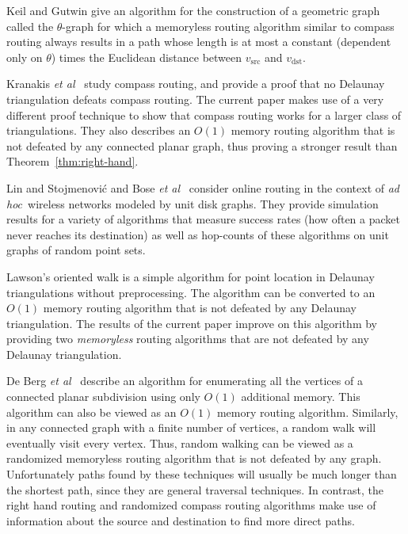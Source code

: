 \documentclass[final]{siamltex}
\newcommand{\comment}[1]{}
\newcommand{\etal}{{\em et al\/}}
\newcommand{\adhoc}{{\em ad hoc\/}}
\newcommand{\thmref}[1]{Theorem~\ref{thm:#1}}
\newcommand{\vsrc}{v_\mathrm{src}}
\newcommand{\vdest}{v_\mathrm{dst}}
\begin{document}
Keil and Gutwin \cite{kg92} give an algorithm for the construction of
a geometric graph called the $\theta$-graph for which a memoryless
routing algorithm similar to compass routing always results in a path
whose length is at most a constant (dependent only on $\theta$) times
the Euclidean distance between $\vsrc$ and $\vdest$.


Kranakis \etal\ \cite{ksu99} study compass routing, and provide a
proof that no Delaunay triangulation defeats compass routing.  The
current paper makes use of a very different proof technique to show
that compass routing works for a larger class of triangulations.  They
also describes an $O(1)$ memory routing algorithm that is not defeated
by any connected planar graph, thus proving a stronger result than
\thmref{right-hand}.

Lin and Stojmenovi\'c \cite{ls98} and Bose \etal\ \cite{bmsu99}
consider online routing in the context of \adhoc\ wireless networks
modeled by unit disk graphs.  They provide simulation results for a
variety of algorithms that measure success rates (how often a packet
never reaches its destination) as well as hop-counts of these
algorithms on unit graphs of random point sets.

Lawson's oriented walk \cite{l77} is a simple algorithm for point
location in Delaunay triangulations without preprocessing.  The
algorithm can be converted to an $O(1)$ memory routing algorithm that
is not defeated by any Delaunay triangulation.  The results of the
current paper improve on this algorithm by providing two {\em
memoryless\/} routing algorithms that are not defeated by any Delaunay
triangulation.

\comment{Generalizing results of Gold \etal\ \cite{gcr77} and
Edelsbrunner \etal\ \cite{egs86}, } De Berg \etal\ \cite{bkoo97}
describe an algorithm for enumerating all the vertices of a connected
planar subdivision using only $O(1)$ additional memory.  This
algorithm can also be viewed as an $O(1)$ memory routing algorithm.
Similarly, in any connected graph with a finite number of vertices, a
random walk will eventually visit every vertex.  Thus, random walking
can be viewed as a randomized memoryless routing algorithm that is not
defeated by any graph.  Unfortunately paths found by these techniques
will usually be much longer than the shortest path, since they are
general traversal techniques.  In contrast, the right hand routing and
randomized compass routing algorithms make use of information about
the source and destination to find more direct paths.
\end{document}
